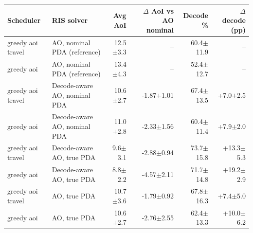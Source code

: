 \begin{tabular}{llrrrr}
\toprule
Scheduler & RIS solver & Avg AoI & $\Delta$ AoI vs AO nominal & Decode \% & $\Delta$ decode (pp) \\
\midrule
greedy aoi travel & AO, nominal PDA (reference) & 12.5$\pm$3.3 & -- & 60.4$\pm$11.9 & -- \\
greedy aoi & AO, nominal PDA (reference) & 13.4$\pm$4.3 & -- & 52.4$\pm$12.7 & -- \\
greedy aoi travel & Decode-aware AO, nominal PDA & 10.6$\pm$2.7 & -1.87$\pm$1.01 & 67.4$\pm$13.5 & +7.0$\pm$2.5 \\
greedy aoi & Decode-aware AO, nominal PDA & 11.0$\pm$2.8 & -2.33$\pm$1.56 & 60.4$\pm$11.4 & +7.9$\pm$2.0 \\
greedy aoi travel & Decode-aware AO, true PDA & 9.6$\pm$3.1 & -2.88$\pm$0.94 & 73.7$\pm$15.8 & +13.3$\pm$5.3 \\
greedy aoi & Decode-aware AO, true PDA & 8.8$\pm$2.2 & -4.57$\pm$2.11 & 71.7$\pm$14.8 & +19.2$\pm$2.9 \\
greedy aoi travel & AO, true PDA & 10.7$\pm$3.6 & -1.79$\pm$0.92 & 67.8$\pm$16.3 & +7.4$\pm$5.0 \\
greedy aoi & AO, true PDA & 10.6$\pm$2.7 & -2.76$\pm$2.55 & 62.4$\pm$13.3 & +10.0$\pm$6.2 \\
\bottomrule
\end{tabular}
